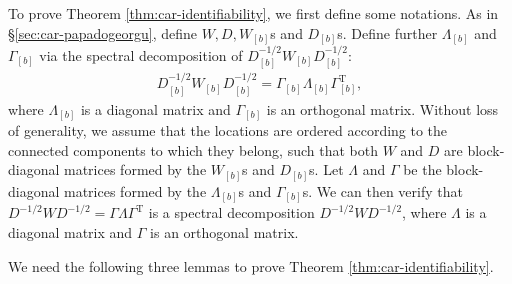\documentclass[11pt]{article}
\theoremstyle{definition}
\theoremstyle{remark}
\def\top{{ \mathrm{\scriptscriptstyle T} }}
\begin{document}
To prove Theorem \ref{thm:car-identifiability}, we first define some notations. As in \S\ref{sec:car-papadogeorgu}, define $W, D, W_{[b]}$s and $D_{[b]}$s. 
Define further $\Lambda_{[b]}$ and $\Gamma_{[b]}$ via the spectral decomposition  of $D_{[b]}^{-1/2} W_{[b]} D_{[b]}^{-1/2}$: 
\begin{align*}%
    D_{[b]}^{-1/2} W_{[b]} D_{[b]}^{-1/2} = \Gamma_{[b]} \Lambda_{[b]} \Gamma_{[b]}^\top,
\end{align*}
where $\Lambda_{[b]}$ is a diagonal matrix and $\Gamma_{[b]}$ is an orthogonal matrix. 
Without loss of generality, we assume that the locations are ordered according to the connected components to which they belong, such that both $W$ and $D$ are block-diagonal matrices formed by the $W_{[b]}$s and $D_{[b]}$s. 
Let $\Lambda$ and $\Gamma$ be the block-diagonal matrices formed by the $\Lambda_{[b]}$s and $\Gamma_{[b]}$s. We can then verify that  
$D^{-1/2} W D^{-1/2} = \Gamma \Lambda \Gamma^\top$ is a spectral decomposition $D^{-1/2} W D^{-1/2}$, 
where $\Lambda$ is a diagonal matrix and $\Gamma$ is an orthogonal matrix.

We need the following three lemmas to prove Theorem \ref{thm:car-identifiability}.  
\end{document}
